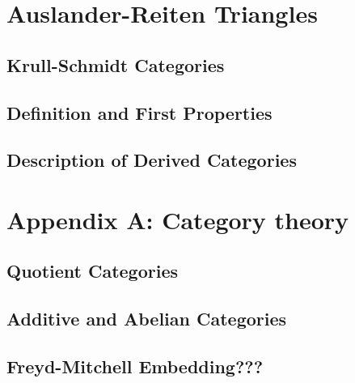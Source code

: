 \documentclass[12pt]{article}
\theoremstyle{definition}
\theoremstyle{remark}
\begin{document}
    \section{Auslander-Reiten Triangles}

        \subsection{Krull-Schmidt Categories}

        \subsection{Definition and First Properties}

        \subsection{Description of Derived Categories}

    \clearpage

    \section*{Appendix A: Category theory}
        \subsection{Quotient Categories}
        \subsection{Additive and Abelian Categories}
        \subsection{Freyd-Mitchell Embedding???}

    \clearpage
\end{document}
